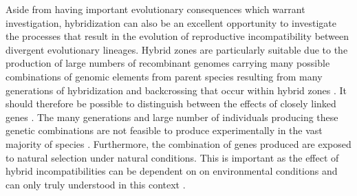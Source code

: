 Aside from having important evolutionary consequences which warrant investigation, 
hybridization can also be an excellent opportunity to investigate the processes
that result in the evolution of reproductive incompatibility between divergent 
evolutionary lineages. 
Hybrid zones are particularly suitable due to the production of large numbers of recombinant 
genomes carrying many possible combinations of genomic elements from parent 
species resulting from many generations of hybridization and backcrossing that occur
within hybrid zones \parencite{rieseberg1999}. 
It should therefore be possible to distinguish between the effects of closely 
linked genes \parencite{rieseberg1999}. 
The many generations and large number of individuals producing these genetic 
combinations are not feasible to produce experimentally in the vast majority of
species \parencite{rieseberg1999}. 
Furthermore, the combination of genes produced are exposed to natural selection 
under natural conditions. 
This is important as the effect of hybrid incompatibilities can be dependent on 
on environmental conditions and can only truly understood in this context \parencite{miller2016}. 


